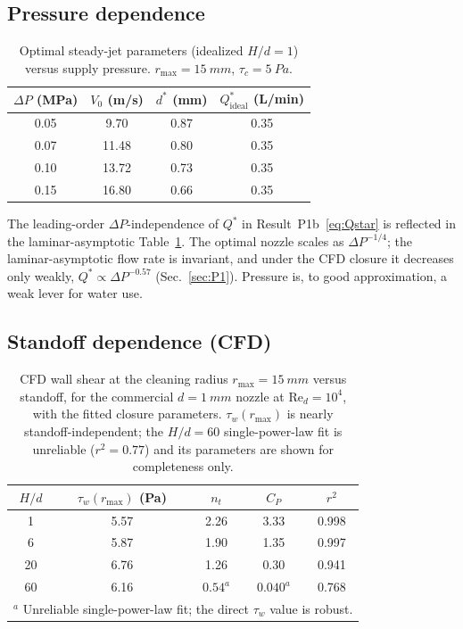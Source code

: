 \documentclass[aps,prfluids,reprint,amsmath,amssymb,floatfix]{revtex4-2}
\newcommand{\Rey}{\mathrm{Re}}
\begin{document}
\subsection{Pressure dependence}

\begin{table}[h]
\centering
\caption{Optimal steady-jet parameters (idealized $H/d = 1$) versus
supply pressure. $r_\mathrm{max} = \SI{15}{mm}$, $\tau_c = \SI{5}{Pa}$.}
\label{tab:pressure}
\begin{tabular}{cccc}
\toprule
$\Delta P$ (MPa) & $V_0$ (m/s) & $d^*$ (mm) & $Q^*_\mathrm{ideal}$ (L/min) \\
\midrule
0.05 & 9.70  & 0.87 & 0.35 \\
0.07 & 11.48 & 0.80 & 0.35 \\
0.10 & 13.72 & 0.73 & 0.35 \\
0.15 & 16.80 & 0.66 & 0.35 \\
\bottomrule
\end{tabular}
\end{table}

The leading-order $\Delta P$-independence of $Q^*$ in
Result~P1b~\eqref{eq:Qstar} is reflected in the laminar-asymptotic
Table~\ref{tab:pressure}. The optimal nozzle scales as $\Delta P^{-1/4}$;
the laminar-asymptotic flow rate is invariant, and under the CFD closure it
decreases only weakly, $Q^* \propto \Delta P^{-0.57}$ (Sec.~\ref{sec:P1}).
Pressure is, to good approximation, a weak lever for water use.

\subsection{Standoff dependence (CFD)}

\begin{table}[h]
\centering
\caption{CFD wall shear at the cleaning radius
$r_\mathrm{max} = \SI{15}{mm}$ versus standoff, for the commercial
$d = \SI{1}{mm}$ nozzle at $\Rey_d = 10^4$, with the fitted closure
parameters. $\tau_w(r_\mathrm{max})$ is nearly standoff-independent; the
$H/d = 60$ single-power-law fit is unreliable ($r^2 = 0.77$) and its
parameters are shown for completeness only.}
\label{tab:standoff}
\begin{tabular}{ccccc}
\toprule
$H/d$ & $\tau_w(r_\mathrm{max})$ (Pa) & $n_t$ & $C_P$ & $r^2$ \\
\midrule
1  & 5.57 & 2.26 & 3.33 & 0.998 \\
6  & 5.87 & 1.90 & 1.35 & 0.997 \\
20 & 6.76 & 1.26 & 0.30 & 0.941 \\
60 & 6.16 & $0.54^a$ & $0.040^a$ & 0.768 \\
\bottomrule
\multicolumn{5}{l}{\footnotesize $^a$ Unreliable single-power-law fit; the
direct $\tau_w$ value is robust.}\\
\end{tabular}
\end{table}
\end{document}
